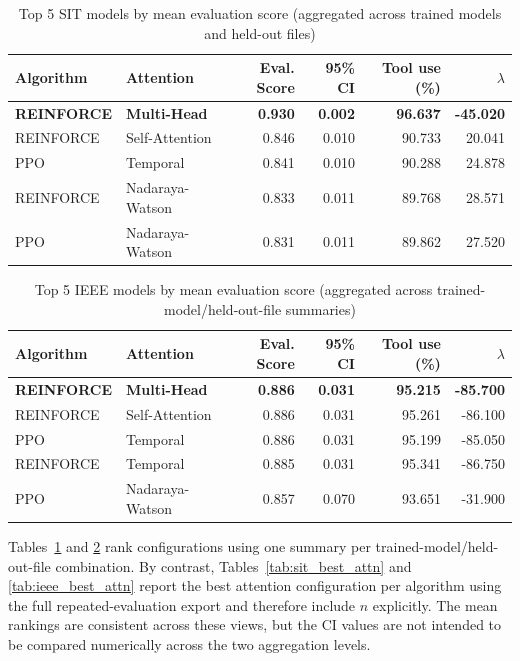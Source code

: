 \documentclass[sn-basic]{sn-jnl} %
\begin{document}
\begin{table}
\caption{Top 5 SIT models by mean evaluation score (aggregated across trained models and held-out files)}
\label{tab:sit_top10}
\begin{tabular}{ll r r r r}
\toprule
\textbf{Algorithm} & \textbf{Attention} & \textbf{Eval. Score} & \textbf{95\% CI} & \textbf{Tool use (\%)} & \textbf{$\lambda$}\\
\midrule
    \textbf{REINFORCE} & \textbf{Multi-Head} & \textbf{0.930} & \textbf{0.002} & \textbf{96.637} & \textbf{-45.020} \\
    REINFORCE & Self-Attention & 0.846 & 0.010 & 90.733 & 20.041 \\
    PPO & Temporal & 0.841 & 0.010 & 90.288 & 24.878 \\
    REINFORCE & Nadaraya-Watson & 0.833 & 0.011 & 89.768 & 28.571 \\
    PPO & Nadaraya-Watson & 0.831 & 0.011 & 89.862 & 27.520 \\
    \bottomrule
\end{tabular}
\end{table}


\begin{table}[htbp]
	\centering
	\caption{Top 5 IEEE models by mean evaluation score (aggregated across trained-model/held-out-file summaries)}
	\label{tab:ieee_top10}
	\begin{tabular}{ll r r r r}
	\toprule
	\textbf{Algorithm} & \textbf{Attention} & \textbf{Eval. Score} & \textbf{95\% CI} & \textbf{Tool use (\%)} & \textbf{$\lambda$}\\
	\midrule
	\textbf{REINFORCE} & \textbf{Multi-Head} & \textbf{0.886} & \textbf{0.031} & \textbf{95.215} & \textbf{-85.700}\\
	REINFORCE & Self-Attention 	& 0.886 & 0.031 & 95.261 & -86.100\\
	PPO & Temporal 				& 0.886 & 0.031 & 95.199 & -85.050\\
	REINFORCE & Temporal 		& 0.885 & 0.031 & 95.341 & -86.750\\
	PPO & Nadaraya-Watson 	& 0.857 & 0.070 & 93.651 & -31.900\\
	\bottomrule
	\end{tabular}
\end{table}

Tables~\ref{tab:sit_top10} and \ref{tab:ieee_top10} rank configurations using one summary per trained-model/held-out-file combination. By contrast, Tables~\ref{tab:sit_best_attn} and \ref{tab:ieee_best_attn} report the best attention configuration per algorithm using the full repeated-evaluation export and therefore include $n$ explicitly. The mean rankings are consistent across these views, but the CI values are not intended to be compared numerically across the two aggregation levels.
\end{document}
